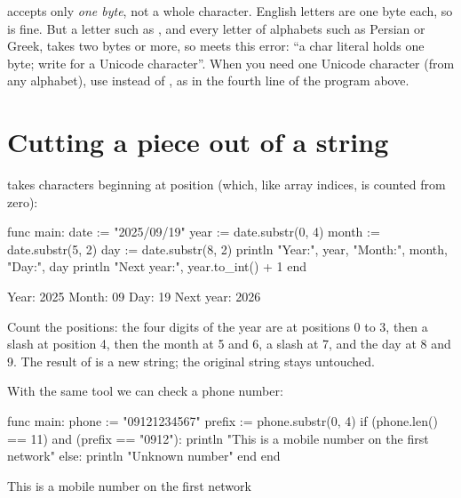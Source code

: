 \begin{warn}
 accepts only \emph{one byte}, not a whole character. English
letters are one byte each, so  is fine. But a letter such as
, and every letter of alphabets such as Persian or Greek, takes two
bytes or more, so  meets this error: ``a char literal holds one
byte; write  for a Unicode character''. When you need one
Unicode character (from any alphabet), use  instead of
, as in the fourth line of the program above.
\end{warn}

\section{Cutting a piece out of a string}

 takes  characters beginning at
position  (which, like array indices, is counted from zero):

\begin{salamcode}
func main:
    date := "2025/09/19"
    year := date.substr(0, 4)
    month := date.substr(5, 2)
    day := date.substr(8, 2)
    println "Year:", year, "Month:", month, "Day:", day
    println "Next year:", year.to_int() + 1
end
\end{salamcode}

\begin{salamout}
Year: 2025 Month: 09 Day: 19
Next year: 2026
\end{salamout}

Count the positions: the four digits of the year are at positions 0 to 3,
then a slash at position 4, then the month at 5 and 6, a slash at 7, and the
day at 8 and 9. The result of  is a new string; the original
string stays untouched.

With the same tool we can check a phone number:

\begin{salamcode}
func main:
    phone := "09121234567"
    prefix := phone.substr(0, 4)
    if (phone.len() == 11) and (prefix == "0912"):
        println "This is a mobile number on the first network"
    else:
        println "Unknown number"
    end
end
\end{salamcode}

\begin{salamout}
This is a mobile number on the first network
\end{salamout}


